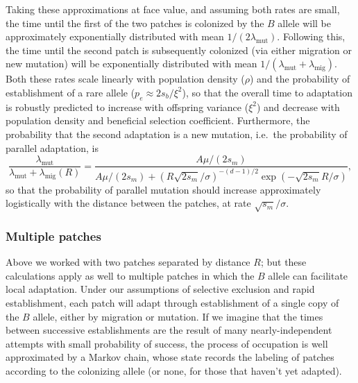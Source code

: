\documentclass{article}
\newcommand{\migrate}{\lambda_\text{mig}}
\newcommand{\mutrate}{\lambda_\text{mut}}
\begin{document}
Taking these approximations at face value, 
and assuming both rates are small, 
the time until the first of the two patches is colonized by the $B$
allele will be approximately exponentially distributed with mean $1/(2
\mutrate)$.
Following this, the time until the second patch is subsequently colonized 
(via either migration or new mutation) 
will be exponentially distributed with mean $1/(\mutrate+\migrate)$.
Both these rates scale linearly with population density ($\rho$) 
and the probability of establishment of a rare allele ($p_e\approx 2 s_b/\xi^2$),
so that the overall time to adaptation is robustly predicted to increase with offspring variance ($\xi^2$)
and decrease with population density and beneficial selection coefficient.
Furthermore, the probability that the second adaptation is a new mutation,
i.e.\ the probability of parallel adaptation, is 
\begin{equation} \label{eqn:parallel_prob}
    \frac{\mutrate}{\mutrate+\migrate(R)} = \frac{ A \mu / (2s_m) }{ A \mu / (2s_m) + \left(R \sqrt{2 s_m} /\sigma \right)^{-(d-1)/2}\exp\left(- \sqrt{2 s_m} R / \sigma \right) },  
\end{equation}
so that the probability of parallel mutation should increase
approximately logistically with the distance between the patches, at rate $\sqrt{s_m} /\sigma$. 


\subsubsection{Multiple patches}
Above we worked with two patches separated by distance $R$;
but these calculations apply as well to multiple patches
in which the $B$ allele can facilitate local adaptation. 
Under our assumptions of selective exclusion and rapid establishment, 
each patch will adapt through establishment of a single copy of the $B$ allele, 
either by migration or mutation.
If we imagine that the times between successive establishments are the result of many nearly-independent attempts
with small probability of success,
the process of occupation is well approximated by a Markov chain,
whose state records the labeling of patches according to the colonizing allele
(or none, for those that haven't yet adapted).
\end{document}
